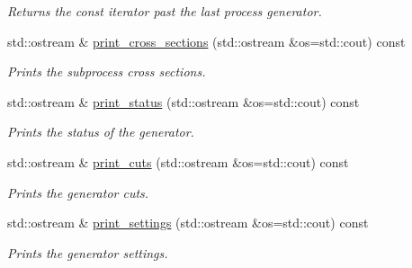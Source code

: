 \begin{DoxyCompactItemize}
\begin{DoxyCompactList}\small\item\em Returns the const iterator past the last process generator. \end{DoxyCompactList}\item 
\hypertarget{a00212_a600c6463d26cb42cfb01ad2a5fa81e8a}{}std\+::ostream \& \hyperlink{a00212_a600c6463d26cb42cfb01ad2a5fa81e8a}{print\+\_\+cross\+\_\+sections} (std\+::ostream \&os=std\+::cout) const \label{a00212_a600c6463d26cb42cfb01ad2a5fa81e8a}

\begin{DoxyCompactList}\small\item\em Prints the subprocess cross sections. \end{DoxyCompactList}\item 
\hypertarget{a00212_a7138ff23c58327dd958c5d261ab18421}{}std\+::ostream \& \hyperlink{a00212_a7138ff23c58327dd958c5d261ab18421}{print\+\_\+status} (std\+::ostream \&os=std\+::cout) const \label{a00212_a7138ff23c58327dd958c5d261ab18421}

\begin{DoxyCompactList}\small\item\em Prints the status of the generator. \end{DoxyCompactList}\item 
\hypertarget{a00212_abe047fb221ea9c4d0d4abaddd270b585}{}std\+::ostream \& \hyperlink{a00212_abe047fb221ea9c4d0d4abaddd270b585}{print\+\_\+cuts} (std\+::ostream \&os=std\+::cout) const \label{a00212_abe047fb221ea9c4d0d4abaddd270b585}

\begin{DoxyCompactList}\small\item\em Prints the generator cuts. \end{DoxyCompactList}\item 
\hypertarget{a00212_a497a6bcd40e63046684035f933e66146}{}std\+::ostream \& \hyperlink{a00212_a497a6bcd40e63046684035f933e66146}{print\+\_\+settings} (std\+::ostream \&os=std\+::cout) const \label{a00212_a497a6bcd40e63046684035f933e66146}

\begin{DoxyCompactList}\small\item\em Prints the generator settings. \end{DoxyCompactList}\end{DoxyCompactItemize}
